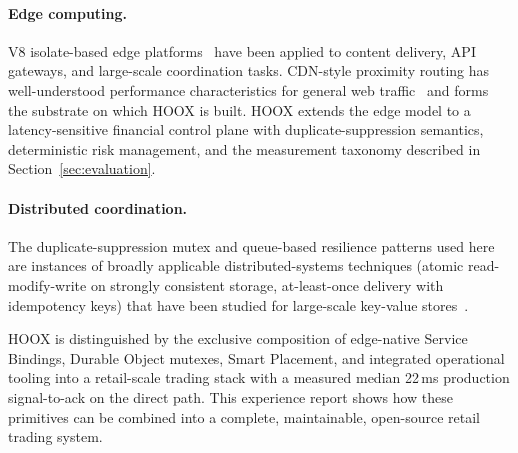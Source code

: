 \paragraph{Edge computing.} V8 isolate-based edge platforms~\cite{jonas2019berkeley,agache2020firecracker,cloudflare-workers} have been applied to content delivery, API gateways, and large-scale coordination tasks. CDN-style proximity routing has well-understood performance characteristics for general web traffic~\cite{nygren2010akamai,singh2015jupiter} and forms the substrate on which \textsc{HOOX} is built. \textsc{HOOX} extends the edge model to a latency-sensitive financial control plane with duplicate-suppression semantics, deterministic risk management, and the measurement taxonomy described in Section~\ref{sec:evaluation}.

\paragraph{Distributed coordination.} The duplicate-suppression mutex and queue-based resilience patterns used here are instances of broadly applicable distributed-systems techniques (atomic read-modify-write on strongly consistent storage, at-least-once delivery with idempotency keys) that have been studied for large-scale key-value stores~\cite{decandia2007dynamo,shahrad2020serverless,cloudflare-durable-objects}.

\textsc{HOOX} is distinguished by the exclusive composition of edge-native Service Bindings, Durable Object mutexes, Smart Placement, and integrated operational tooling into a retail-scale trading stack with a measured median 22\,ms production signal-to-ack on the direct path. This experience report shows how these primitives can be combined into a complete, maintainable, open-source retail trading system.
